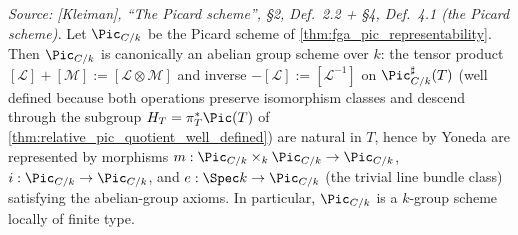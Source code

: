 \begin{theorem}
  \label{thm:pic_is_group_scheme}

  \textit{Source: [Kleiman], ``The Picard scheme'', \S 2, Def.~2.2 +
  \S 4, Def.~4.1 (the Picard scheme).}
  Let \(\Pic_{C/k}\) be the Picard scheme of
  \cref{thm:fga_pic_representability}. Then \(\Pic_{C/k}\) is canonically an
  abelian group scheme over \(k\): the tensor product
  \([\mathcal{L}] + [\mathcal{M}] := [\mathcal{L} \otimes \mathcal{M}]\)
  and inverse \(-[\mathcal{L}] := [\mathcal{L}^{-1}]\) on
  \(\Pic^\sharp_{C/k}(T)\) (well defined because both operations
  preserve isomorphism classes and descend through the subgroup
  \(H_T = \pi_T^*\Pic(T)\) of \cref{thm:relative_pic_quotient_well_defined})
  are natural in \(T\), hence by Yoneda are represented by morphisms
  \(m : \Pic_{C/k} \times_k \Pic_{C/k} \to \Pic_{C/k}\),
  \(i : \Pic_{C/k} \to \Pic_{C/k}\), and
  \(e : \Spec k \to \Pic_{C/k}\) (the trivial line bundle class) satisfying
  the abelian-group axioms. In particular, \(\Pic_{C/k}\) is a \(k\)-group
  scheme locally of finite type.
\end{theorem}

